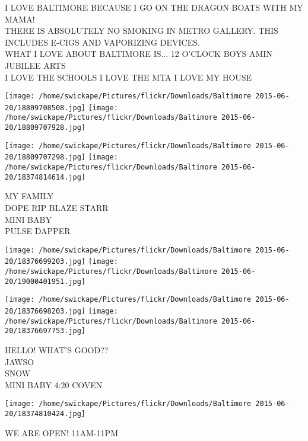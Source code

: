 \documentclass[10pt,letterpaper]{article}
\begin{document}
I LOVE BALTIMORE BECAUSE I GO ON THE DRAGON BOATS WITH MY MAMA!\\
THERE IS ABSOLUTELY NO SMOKING IN METRO GALLERY.  THIS INCLUDES E{-}CIGS AND VAPORIZING DEVICES.\\
WHAT I LOVE ABOUT BALTIMORE IS... 12 O'CLOCK BOYS AMIN JUBILEE ARTS\\
I LOVE THE SCHOOLS I LOVE THE MTA I LOVE MY HOUSE
\pagebreak

\texttt{[image: /home/swickape/Pictures/flickr/Downloads/Baltimore 2015-06-20/18809708508.jpg]}
\texttt{[image: /home/swickape/Pictures/flickr/Downloads/Baltimore 2015-06-20/18809707928.jpg]}

\texttt{[image: /home/swickape/Pictures/flickr/Downloads/Baltimore 2015-06-20/18809707298.jpg]}
\texttt{[image: /home/swickape/Pictures/flickr/Downloads/Baltimore 2015-06-20/18374814614.jpg]}

MY FAMILY\\
DOPE RIP BLAZE STARR\\
MINI BABY\\
PULSE DAPPER
\pagebreak

\texttt{[image: /home/swickape/Pictures/flickr/Downloads/Baltimore 2015-06-20/18376699203.jpg]}
\texttt{[image: /home/swickape/Pictures/flickr/Downloads/Baltimore 2015-06-20/19000401951.jpg]}

\texttt{[image: /home/swickape/Pictures/flickr/Downloads/Baltimore 2015-06-20/18376698203.jpg]}
\texttt{[image: /home/swickape/Pictures/flickr/Downloads/Baltimore 2015-06-20/18376697753.jpg]}

HELLO!  WHAT'S GOOD??\\
JAWSO\\
SNOW\\
MINI BABY 4:20 COVEN
\pagebreak

\texttt{[image: /home/swickape/Pictures/flickr/Downloads/Baltimore 2015-06-20/18374810424.jpg]}

WE ARE OPEN!  11AM{-}11PM
\pagebreak
\end{document}
